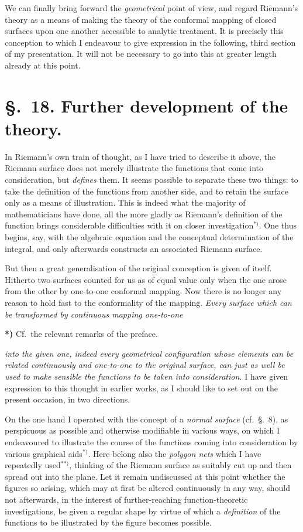 \documentclass{article}
\begin{document}
We can finally bring forward the \emph{geometrical} point of view, and regard Riemann's theory as a means of making the theory of the conformal mapping of closed surfaces upon one another accessible to analytic treatment. It is precisely this conception to which I endeavour to give expression in the following, third section of my presentation. It will not be necessary to go into this at greater length already at this point.

\section*{§.~18. Further development of the theory.}

In Riemann's own train of thought, as I have tried to describe it above, the Riemann surface does not merely illustrate the functions that come into consideration, but \emph{defines} them. It seems possible to separate these two things: to take the definition of the functions from another side, and to retain the surface only as a means of illustration. This is indeed what the majority of mathematicians have done, all the more gladly as Riemann's definition of the function brings considerable difficulties with it on closer investigation${}^{*)}$. One thus begins, say, with the algebraic equation and the conceptual determination of the integral, and only afterwards constructs an associated Riemann surface.

But then a great generalisation of the original conception is given of itself. Hitherto two surfaces counted for us as of equal value only when the one arose from the other by one-to-one conformal mapping. Now there is no longer any reason to hold fast to the conformality of the mapping. \emph{Every surface which can be transformed by continuous mapping one-to-one}

\textbf{*)} Cf.\ the relevant remarks of the preface.

\emph{into the given one, indeed every geometrical configuration whose elements can be related continuously and one-to-one to the original surface, can just as well be used to make sensible the functions to be taken into consideration.} I have given expression to this thought in earlier works, as I should like to set out on the present occasion, in two directions.

On the one hand I operated with the concept of a \emph{normal surface} (cf.\ §.~8), as perspicuous as possible and otherwise modifiable in various ways, on which I endeavoured to illustrate the course of the functions coming into consideration by various graphical aids${}^{*)}$. Here belong also the \emph{polygon nets} which I have repeatedly used${}^{**)}$, thinking of the Riemann surface as suitably cut up and then spread out into the plane. Let it remain undiscussed at this point whether the figures so arising, which may at first be altered continuously in any way, should not afterwards, in the interest of further-reaching function-theoretic investigations, be given a regular shape by virtue of which a \emph{definition} of the functions to be illustrated by the figure becomes possible.
\end{document}
